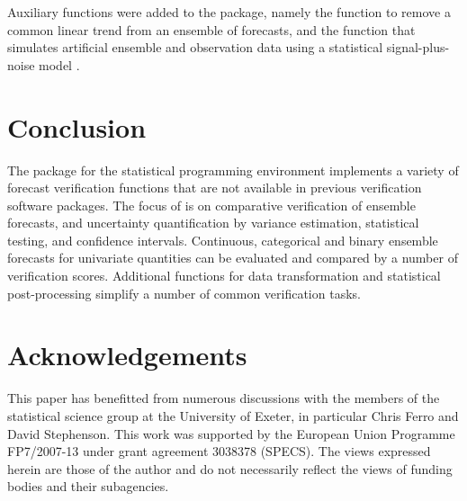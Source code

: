 \documentclass[article]{jss}\usepackage{graphicx, color}
\begin{document}
Auxiliary functions were added to the package, namely the function  to remove a common linear trend from an ensemble of forecasts, and the function  that simulates artificial ensemble and observation data using a statistical signal-plus-noise model \citep{siegert2016bayesian}.




\section{Conclusion}

The package  for the  statistical programming environment implements a variety of forecast verification functions that are not available in previous verification software packages.
The focus of  is on comparative verification of ensemble forecasts, and uncertainty quantification by variance estimation, statistical testing, and confidence intervals.
Continuous, categorical and binary ensemble forecasts for univariate quantities can be evaluated and compared by a number of verification scores.
Additional functions for data transformation and statistical post-processing simplify a number of common verification tasks.


\section*{Acknowledgements}

This paper has benefitted from numerous discussions with the members of the statistical science group at the University of Exeter, in particular Chris Ferro and David Stephenson.
This work was supported by the European Union Programme FP7/2007-13 under grant agreement 3038378 (SPECS).
The views expressed herein are those of the author and do not necessarily reflect the views of funding bodies and their subagencies.



\end{document}
